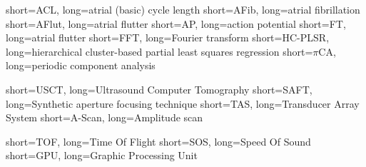 \usepackage{enumitem}
\newlength\myitemwidth
\setlength\myitemwidth{9em} 						%












  		{short={ACL},		long={atrial (basic) cycle length}}
  		{short={AFib},		long={atrial fibrillation}}
  		{short={AFlut},		long={atrial flutter}}
  		{short={AP},			long={action potential}}
  		{short={FT},			long={atrial flutter}}
  		{short={FFT},		long={Fourier transform}}
  	{short={HC-PLSR},	long={hierarchical cluster-based partial least squares regression}}
  		{short={$\pi$CA},	long={periodic component analysis}}
  
		{short={USCT},	long={Ultrasound Computer Tomography}}
		{short={SAFT},	long={Synthetic aperture focusing technique}}
		{short={TAS},	long={Transducer Array System}}
		{short={A-Scan},	long={Amplitude scan}}

		{short={TOF},	long={Time Of Flight}}
		{short={SOS},	long={Speed Of Sound}}
        {short={GPU},	long={Graphic Processing Unit}}
